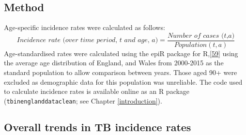 \documentclass[11pt,twoside]{bristolthesis}
\begin{document}
  \hypertarget{method-1}{%
  \subsection{Method}\label{method-1}}
  
  Age-specific incidence rates were calculated as follows:
  \begin{equation} 
    \textit{Incidence rate (over time period, t and age, a)} = \frac{\textit{Number of cases (t,a)}}{Population(t, a)}
    \label{eq:incEq}
  \end{equation}
  Age-standardised rates were calculated using the epiR package for R,{[}\protect\hyperlink{ref-Stevenson2016}{59}{]} using the average age distribution of England, and Wales from 2000-2015 as the standard population to allow comparison between years. Those aged 90+ were excluded as demographic data for this population was unreliable. The code used to calculate incidence rates is available online as an R package (\texttt{tbinenglanddataclean}; see Chapter \ref{introduction}).
  
  \hypertarget{overall-trends-in-tb-incidence-rates}{%
  \subsection{Overall trends in TB incidence rates}\label{overall-trends-in-tb-incidence-rates}}
  
\end{document}
